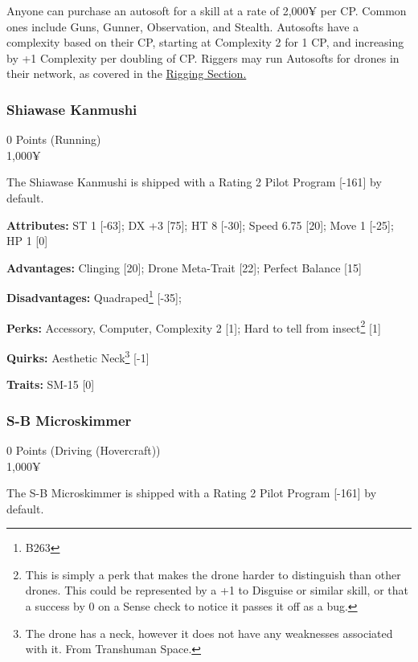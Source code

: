 Anyone can purchase an autosoft for a skill at a rate of 2,000¥ per CP. Common ones include Guns, Gunner, Observation, and Stealth. Autosofts have a complexity based on their CP, starting at Complexity 2 for 1 CP, and increasing by +1 Complexity per doubling of CP. Riggers may run Autosofts for drones in their network, as covered in the \hyperref[rigger_rules]{Rigging Section.}



\begin{multicols*}{2}
	
	\subsubsection{Shiawase Kanmushi}
	\begin{flushright}
		0 Points (Running)\\
		1,000¥
	\end{flushright}
	
	The Shiawase Kanmushi is shipped with a Rating 2 Pilot Program [-161] by default.
	
	\textbf{Attributes:} 
	ST 1 [-63]; DX +3 [75]; HT 8 [-30];
	Speed 6.75 [20]; Move 1 [-25]; HP 1 [0]
	
	\textbf{Advantages:} 
	Clinging [20]; Drone Meta-Trait [22]; Perfect Balance [15]
	
	\textbf{Disadvantages:} 
	Quadraped\footnote{B263} [-35];
	
	\textbf{Perks:}
	Accessory, Computer, Complexity 2 [1]; Hard to tell from insect\footnote{This is simply a perk that makes the drone harder to distinguish than other drones. This could be represented by a +1 to Disguise or similar skill, or that a success by 0 on a Sense check to notice it passes it off as a bug.} [1]
	
	\textbf{Quirks:}
	Aesthetic Neck\footnote{The drone has a neck, however it does not have any weaknesses associated with it. From Transhuman Space.} [-1]
	
	\textbf{Traits:}
	SM-15 [0]	
	
	\subsubsection{S-B Microskimmer}
	\begin{flushright}
		0 Points (Driving (Hovercraft))\\
		1,000¥
	\end{flushright}
	
	The S-B Microskimmer is shipped with a Rating 2 Pilot Program [-161] by default.
	

\end{multicols*}
